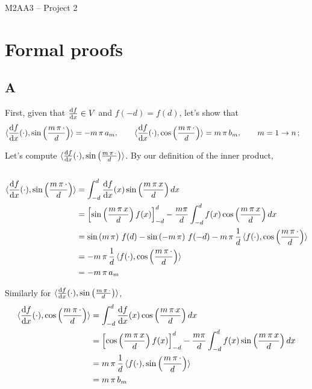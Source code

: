 \documentclass[12pt]{article}
\newcommand{\dfdx}{\frac{{\rm d}f}{{\rm d}x}}
\newcommand{\inprod}[2]{\langle #1, #2 \rangle}
\newcommand{\sinmpiddot}{\sin \left(\frac{m\,\pi\,\cdot}{d}\right)}
\newcommand{\cosmpixd}{\cos \left(\frac{m\,\pi\,x}{d}\right)}
\newcommand{\sinmpixd}{\sin \left(\frac{m\,\pi\,x}{d}\right)}
\newcommand{\cosmpiddot}{\cos \left(\frac{m\,\pi\,\cdot}{d}\right)}
\newcommand{\intd}{\int_{-d}^d}
\begin{document}
\pagestyle{fancyplain}
\cfoot{}{}


\begin{center} \Large
M2AA3 -- Project 2 \\[4mm]
\end{center}





\section{Formal proofs}
\subsection{A}


First, given that $\dfdx \in V$ and $f(-d)=f(d)$, let's show that
\begin{align*}
&\langle \dfdx (\cdot),
\sin \left(\frac{m\,\pi\,\cdot}{d}\right)\rangle
= - m\,\pi\,a_m,
\qquad
\langle \dfdx (\cdot),
\cos \left(\frac{m\,\pi\,\cdot}{d}\right)\rangle
= m\,\pi\,b_m, 
\qquad m=1 \rightarrow n\,;
\end{align*}

Let's compute $\inprod{\dfdx (\cdot)}{\sinmpiddot}$. By our definition of the inner product, \\\\

\begin{equation}
\begin{aligned}
\inprod{\dfdx(\cdot)}{\sinmpiddot} &= \intd \dfdx(x) \sinmpixd dx\\
	&= \left[\sinmpixd f(x)\right]_{-d}^d - \frac{m \pi}{d} \intd f(x)  \cosmpixd dx\\
	&= \sin \left(m\,\pi\right)\,f(d) - \sin \left(-m\,\pi\right)\,f(-d) - m\,\pi\,\frac{1}{d}\,\inprod{f(\cdot)}{\cosmpiddot}\\
	&= - m\,\pi\,\frac{1}{d}\,\inprod{f(\cdot)}{\cosmpiddot}\\
	&= -m\,\pi\,a_m
\end{aligned}
\end{equation}


Similarly for $\inprod{\dfdx (\cdot)}{\sinmpiddot}$,
\begin{equation}
\begin{aligned}
\inprod{\dfdx(\cdot)}{\cosmpiddot} &= \intd \dfdx(x) \cosmpixd dx\\
	&= \left[\cosmpixd f(x)\right]_{-d}^d - \frac{m \pi}{d} \intd f(x)  \sinmpixd dx\\
	&=  m\,\pi\,\frac{1}{d}\,\inprod{f(\cdot)}{\sinmpiddot}\\
	&= m\,\pi\,b_m 
\end{aligned}
\end{equation}
\end{document}
